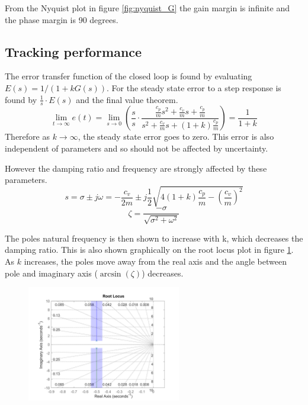 \documentclass{article}
\begin{document}
From the Nyquist plot in figure \ref{fig:nyquist_G} the gain margin is infinite and the phase margin is 90 degrees.

\subsection{Tracking performance}


The error transfer function of the closed loop is found by evaluating $E(s) = 1/(1+kG(s))$.
For the steady state error to a step response is found by $\frac{1}{s} \cdot E(s)$ and the final value theorem.
\begin{equation}
    \lim_{t \to \infty} e(t) = \lim_{s \to 0} \left( \frac{s}{s} \cdot \frac{\frac{c_p}{m}s^2 + \frac{c_v}{m}s + \frac{c_p}{m}}{s^2 + \frac{c_v}{m}s + (1+k)\frac{c_p}{m}} \right) = \frac{1}{1+k}
\end{equation}
Therefore as $k \to \infty$, the steady state error goes to zero.
This error is also independent of parameters and so should not be affected by uncertainty.

However the damping ratio and frequency are strongly affected by these parameters.
\begin{equation}
    s = \sigma \pm j\omega = -\frac{c_v}{2m} \pm j \frac{1}{2} \sqrt{4(1+k)\frac{c_p}{m} - \left(\frac{c_v}{m}\right)^2}
\end{equation}
\begin{equation}
    \zeta = \frac{-\sigma }{ \sqrt{\sigma^2 + \omega^2}}
\end{equation}

The poles natural frequency is then shown to increase with k, which decreases the damping ratio.
This is also shown graphically on the root locus plot in figure \ref{fig:rlocus_G}.
As $k$ increases, the poles move away from the real axis and the angle between pole and imaginary axis ($\arcsin(\zeta)$) decreases.

\begin{figure}[H]
    \centering
    \includegraphics[width=0.6\textwidth]{figures/rlocus_G.png}
    \caption{}
    \label{fig:rlocus_G}
\end{figure}
\end{document}

